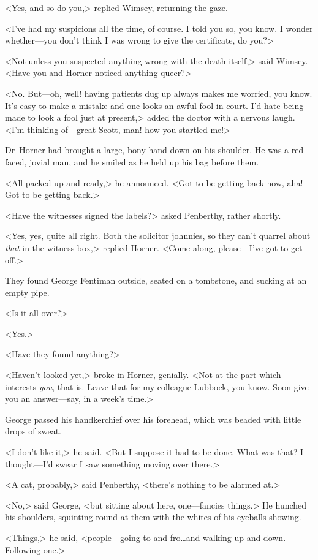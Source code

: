 <Yes, and so do you,> replied Wimsey, returning the gaze.

<I've had my suspicions all the time, of course. I told you so, you know. I wonder whether—you don't think I was wrong to give the certificate, do you?>

<Not unless you suspected anything wrong with the death itself,> said Wimsey. <Have you and Horner noticed anything queer?>

<No. But—oh, well! having patients dug up always makes me worried, you know. It's easy to make a mistake and one looks an awful fool in court. I'd hate being made to look a fool just at present,> added the doctor with a nervous laugh. <I'm thinking of—great Scott, man! how you startled me!>

Dr~Horner had brought a large, bony hand down on his shoulder. He was a red-faced, jovial man, and he smiled as he held up his bag before them.

<All packed up and ready,> he announced. <Got to be getting back now, aha! Got to be getting back.>

<Have the witnesses signed the labels?> asked Penberthy, rather shortly.

<Yes, yes, quite all right. Both the solicitor johnnies, so they can't quarrel about \emph{that} in the witness-box,> replied Horner. <Come along, please—I've got to get off.>

They found George Fentiman outside, seated on a tombstone, and sucking at an empty pipe.

<Is it all over?>

<Yes.>

<Have they found anything?>

<Haven't looked yet,> broke in Horner, genially. <Not at the part which interests \emph{you}, that is. Leave that for my colleague Lubbock, you know. Soon give you an answer—say, in a week's time.>

George passed his handkerchief over his forehead, which was beaded with little drops of sweat.

<I don't like it,> he said. <But I suppose it had to be done. What was that? I thought—I'd swear I saw something moving over there.>

<A cat, probably,> said Penberthy, <there's nothing to be alarmed at.>

<No,> said George, <but sitting about here, one—fancies things.> He hunched his shoulders, squinting round at them with the whites of his eyeballs showing.

<Things,> he said, <people—going to and fro\dots  and walking up and down. Following one.>